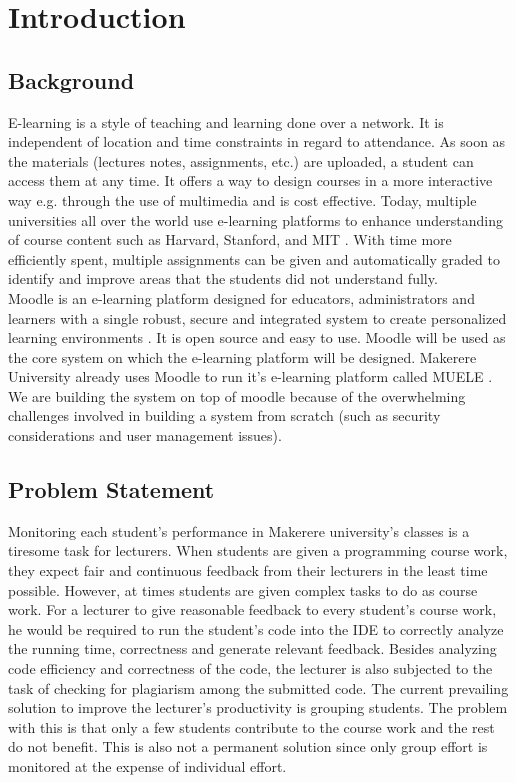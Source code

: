 \documentclass[12pt]{article}
\begin{document}
\section{Introduction}
	\subsection{Background}
		E-learning is a style of teaching and learning done over a network. It is independent of location and time constraints in regard to attendance. As soon as the materials (lectures notes, assignments, etc.) are uploaded, a student can access them at any time. It offers a way to design courses in a more interactive way e.g. through the use of multimedia and is cost effective. Today, multiple universities all over the world use e-learning platforms to enhance understanding of course content such as Harvard, Stanford, and MIT \cite{singh}. With time more efficiently spent, multiple assignments can be given and automatically graded to identify and improve areas that the students did not understand fully.\\
		
		\noindent Moodle is an e-learning platform designed for educators, administrators and learners with a single robust, secure and integrated system to create personalized learning environments \cite{moodle}. It is open source and easy to use. Moodle will be used as the core system on which the e-learning platform will be designed. Makerere University already uses Moodle to run it's e-learning platform called MUELE \cite{muele}. We are building the system on top of moodle because of the overwhelming challenges involved in building a system from scratch (such as security considerations and user management issues).
	\subsection{Problem Statement}
		Monitoring each student's performance in Makerere university's classes is a tiresome task for lecturers. When students are given a programming course work, they expect fair and continuous feedback from their lecturers in the least time possible. However, at times students are given complex tasks to do as course work. For a lecturer to give reasonable feedback to every student's course work, he would be required to run the student's code into the IDE to correctly analyze the running time, correctness and generate relevant feedback. Besides analyzing code efficiency and correctness of the code, the lecturer is also subjected to the task of checking for plagiarism among the submitted code. The current prevailing solution to improve the lecturer's productivity is grouping students. The problem with this is that only a few students contribute to the course work and the rest do not benefit. This is also not a permanent solution since only group effort is monitored at the expense of individual effort.\\
		
\end{document}
